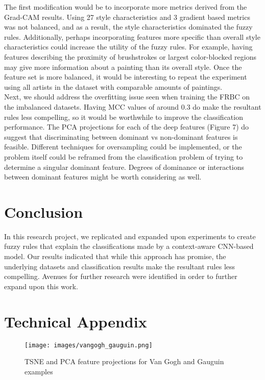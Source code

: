\documentclass{article}
\begin{document}
The first modification would be to incorporate more metrics derived from the Grad-CAM results. Using 27 style characteristics and 3 gradient based metrics was not balanced, and as a result, the style characteristics dominated the fuzzy rules. Additionally, perhaps incorporating features more specific than overall style characteristics could increase the utility of the fuzzy rules. For example, having features describing the proximity of brushstrokes or largest color-blocked regions may give more information about a painting than its overall style. Once the feature set is more balanced, it would be interesting to repeat the experiment using all artists in the dataset with comparable amounts of paintings. \\

Next, we should address the overfitting issue seen when training the FRBC on the imbalanced datasets. Having MCC values of around 0.3 do make the resultant rules less compelling, so it would be worthwhile to improve the classification performance. The PCA projections for each of the deep features (Figure 7) do suggest that discriminating between dominant vs non-dominant features is feasible. Different techniques for oversampling could be implemented, or the problem itself could  be reframed from the classification problem of trying to determine a singular dominant feature. Degrees of dominance or interactions between dominant features might be worth considering as well.

\section{Conclusion}
In this research project, we replicated and expanded upon experiments to create fuzzy rules that explain the classifications made by a context-aware CNN-based model. Our results indicated that while this approach has promise, the underlying datasets and classification results make the resultant rules less compelling. Avenues for further research were identified in order to further expand upon this work.


\newpage



\newpage
\appendix

\section{Technical Appendix}
\begin{figure}[h!]
    \centering
    \texttt{[image: images/vangogh\_gauguin.png]}
    \caption{TSNE and PCA feature projections for Van Gogh and Gauguin examples}
    \label{F:1}
\end{figure}
\end{document}
